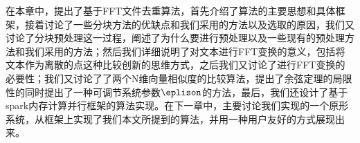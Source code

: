 在本章中，提出了基于FFT文件去重算法，首先介绍了算法的主要思想和具体框架，接着讨论了一些分块方法的优缺点和我们采用的方法以及选取的原因，我们又讨论了分块预处理这一过程，阐述了为什么要进行预处理以及一些现有的预处理方法和我们采用的方法；然后我们详细说明了对文本进行FFT变换的意义，包括将文本作为离散的点这种比较创新的思维方式，之后我们又讨论了进行FFT变换的必要性；我们又讨论了了两个N维向量相似度的比较算法，提出了余弦定理的局限性的同时提出了一种可调节系统参数$\eplison$的方法，最后，我们还设计了基于spark内存计算并行框架的算法实现。在下一章中，主要讨论我们实现的一个原形系统，从框架上实现了我们本文所提到的算法，并用一种用户友好的方式展现出来。

